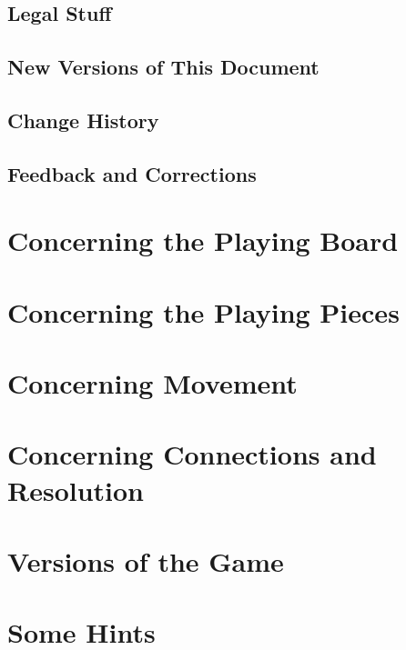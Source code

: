 \documentclass[12pt,a4paper]{article}
\begin{document}
  \subsection{Legal Stuff}\label{legal}
    
  \subsection{New Versions of This Document}\label{docversions}
    
  \subsection{Change History}\label{history}
    
  \subsection{Feedback and Corrections}\label{feedback}
    
%
%
%
\section{Concerning the Playing Board}\label{layout}
  
%
%
\section{Concerning the Playing Pieces}\label{pieces}
  
%
%
\section{Concerning Movement}\label{movement}
  
%
%
\section{Concerning Connections and Resolution}\label{connectres}
  
%
%
\section{Versions of the Game}\label{versions}
  
%
%
\section{Some Hints}\label{hints}
  
%
%
\appendix
\end{document}
